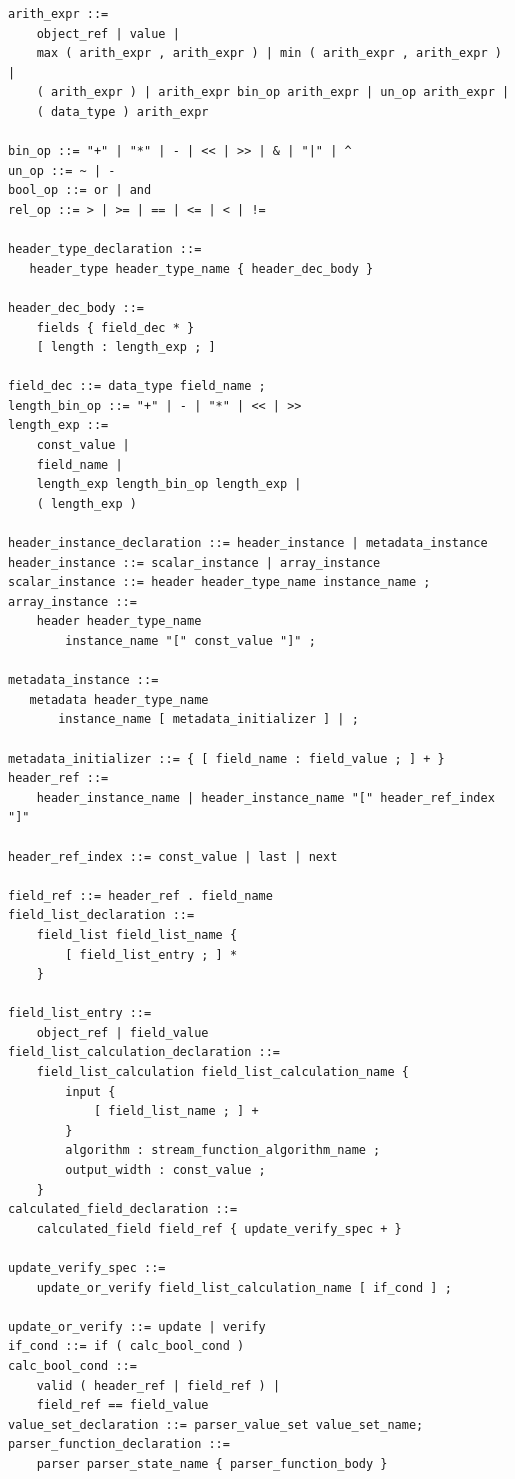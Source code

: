 \documentclass[12pt]{article}
\begin{document}
\begin{lstlisting}[style=BNFstyle]
arith_expr ::=
    object_ref | value | 
    max ( arith_expr , arith_expr ) | min ( arith_expr , arith_expr ) |
    ( arith_expr ) | arith_expr bin_op arith_expr | un_op arith_expr |
    ( data_type ) arith_expr

bin_op ::= "+" | "*" | - | << | >> | & | "|" | ^
un_op ::= ~ | -
bool_op ::= or | and
rel_op ::= > | >= | == | <= | < | !=

header_type_declaration ::= 
   header_type header_type_name { header_dec_body }

header_dec_body ::=
    fields { field_dec * }
    [ length : length_exp ; ]

field_dec ::= data_type field_name ;
length_bin_op ::= "+" | - | "*" | << | >>
length_exp ::=
    const_value |
    field_name |
    length_exp length_bin_op length_exp |
    ( length_exp )

header_instance_declaration ::= header_instance | metadata_instance
header_instance ::= scalar_instance | array_instance
scalar_instance ::= header header_type_name instance_name ;
array_instance ::=
    header header_type_name 
        instance_name "[" const_value "]" ;

metadata_instance ::= 
   metadata header_type_name
       instance_name [ metadata_initializer ] | ;

metadata_initializer ::= { [ field_name : field_value ; ] + }
header_ref ::=
    header_instance_name | header_instance_name "[" header_ref_index "]"

header_ref_index ::= const_value | last | next

field_ref ::= header_ref . field_name
field_list_declaration ::=
    field_list field_list_name {
        [ field_list_entry ; ] *
    }

field_list_entry ::= 
    object_ref | field_value
field_list_calculation_declaration ::=
    field_list_calculation field_list_calculation_name {
        input {
            [ field_list_name ; ] +
        }
        algorithm : stream_function_algorithm_name ;
        output_width : const_value ;
    }
calculated_field_declaration ::=
    calculated_field field_ref { update_verify_spec + }

update_verify_spec ::=
    update_or_verify field_list_calculation_name [ if_cond ] ;

update_or_verify ::= update | verify
if_cond ::= if ( calc_bool_cond )
calc_bool_cond ::=
    valid ( header_ref | field_ref ) |
    field_ref == field_value
value_set_declaration ::= parser_value_set value_set_name;
parser_function_declaration ::=
    parser parser_state_name { parser_function_body }


\end{lstlisting}
\end{document}
